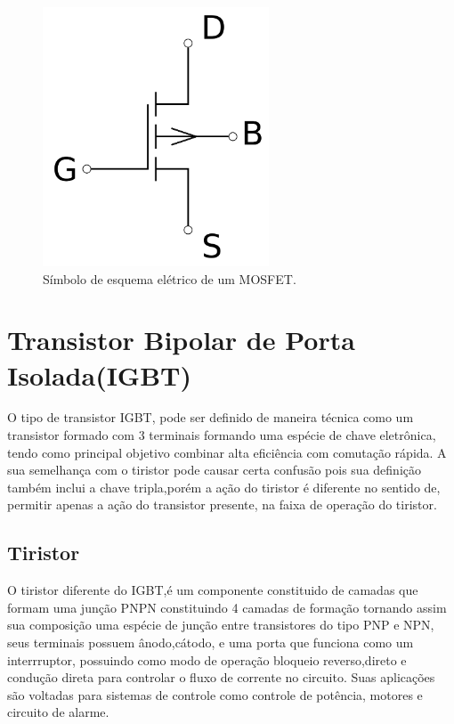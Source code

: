 \documentclass[12pt]{article}
\begin{document}
        \begin{figure}[h]
            
            \centering
            \includegraphics[width=0.6\textwidth]{./images/Mosfet-wp.svg.png}
            \caption{Símbolo de esquema elétrico de um MOSFET.}

        \end{figure}

\section{Transistor Bipolar de Porta Isolada(IGBT)}

    O tipo de transistor IGBT, pode ser definido de maneira técnica como um transistor formado com 3 terminais formando uma espécie de chave eletrônica, tendo como principal objetivo combinar alta eficiência com comutação rápida. A sua semelhança com o tiristor pode causar certa confusão pois sua definição também inclui a chave tripla,porém a ação do tiristor é diferente no sentido de, permitir apenas a ação do transistor presente, na faixa de operação do tiristor.

        \subsection{Tiristor}

        O tiristor diferente do IGBT,é um componente constituido de camadas que formam uma junção PNPN constituindo 4 camadas de formação tornando assim sua composição uma espécie de junção entre transistores do tipo PNP e NPN, seus terminais possuem ânodo,cátodo, e uma porta que funciona como um interrruptor, possuindo como modo de operação bloqueio reverso,direto e condução direta para controlar o fluxo de corrente no circuito. Suas aplicações são voltadas para sistemas de controle como controle de potência, motores e circuito de alarme.
\end{document}
